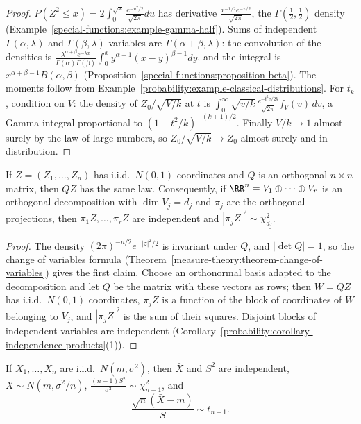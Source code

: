 \begin{proof}
$P(Z^2 \leq x) = 2\int_0^{\sqrt x}\frac{e^{-u^2/2}}{\sqrt{2\pi}}du$ has derivative $\frac{x^{-1/2}e^{-x/2}}{\sqrt{2\pi}}$, the $\Gamma(\frac12, \frac12)$ density (Example~\ref{special-functions:example-gamma-half}). Sums of independent
$\Gamma(\alpha, \lambda)$ and $\Gamma(\beta, \lambda)$ variables are $\Gamma(\alpha + \beta, \lambda)$: the convolution of the densities is $\frac{\lambda^{\alpha+\beta}e^{-\lambda x}}{\Gamma(\alpha)\Gamma(\beta)}\int_0^xy^{\alpha-1}(x - y)^{\beta-1}dy$, and the integral is
$x^{\alpha+\beta-1}B(\alpha, \beta)$ (Proposition~\ref{special-functions:proposition-beta}). The moments follow from Example~\ref{probability:example-classical-distributions}. For $t_k$, condition on $V$: the density of $Z_0/\sqrt{V/k}$ at
$t$ is $\int_0^\infty\sqrt{v/k}\,\frac{e^{-t^2v/2k}}{\sqrt{2\pi}}f_V(v)\,dv$, a Gamma integral proportional to $(1 + t^2/k)^{-(k+1)/2}$. Finally $V/k \to 1$ almost surely by the law of large numbers, so $Z_0/\sqrt{V/k} \to Z_0$ almost
surely and in distribution.
\end{proof}

\begin{lemma}\label{statistics:lemma-orthogonal-invariance}
If $Z = (Z_1, \ldots, Z_n)$ has i.i.d.\ $N(0, 1)$ coordinates and $Q$ is an orthogonal $n \times n$ matrix, then $QZ$ has the same law. Consequently, if $\RR^n = V_1 \oplus \cdots \oplus V_r$ is an orthogonal decomposition with
$\dim V_j = d_j$ and $\pi_j$ are the orthogonal projections, then $\pi_1Z, \ldots, \pi_rZ$ are independent and $|\pi_jZ|^2 \sim \chi^2_{d_j}$.
\end{lemma}

\begin{proof}
The density $(2\pi)^{-n/2}e^{-|z|^2/2}$ is invariant under $Q$, and $|\det Q| = 1$, so the change of variables formula (Theorem~\ref{measure-theory:theorem-change-of-variables}) gives the first claim. Choose an orthonormal basis adapted to the
decomposition and let $Q$ be the matrix with these vectors as rows; then $W = QZ$ has i.i.d.\ $N(0, 1)$ coordinates, $\pi_jZ$ is a function of the block of coordinates of $W$ belonging to $V_j$, and $|\pi_jZ|^2$ is the sum of
their squares. Disjoint blocks of independent variables are independent (Corollary~\ref{probability:corollary-independence-products}(1)).
\end{proof}

\begin{theorem}[Fisher]\label{statistics:theorem-fisher}
If $X_1, \ldots, X_n$ are i.i.d.\ $N(m, \sigma^2)$, then $\bar X$ and $S^2$ are independent, $\bar X \sim N(m, \sigma^2/n)$, $\frac{(n - 1)S^2}{\sigma^2} \sim \chi^2_{n-1}$, and
\[
\frac{\sqrt n(\bar X - m)}{S} \sim t_{n-1}.
\]
\end{theorem}

